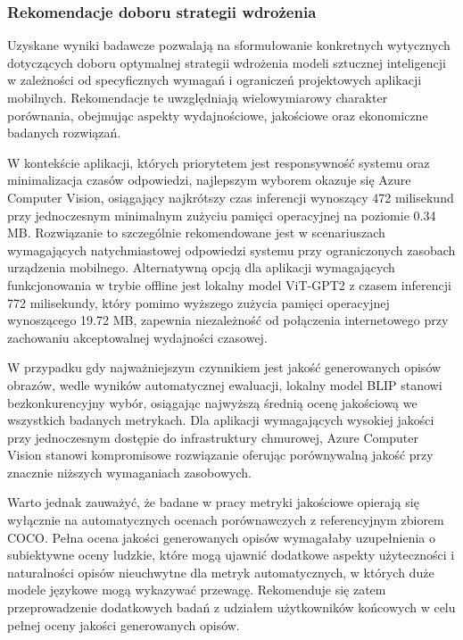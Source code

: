 \subsubsection{Rekomendacje doboru strategii wdrożenia}\label{sss:rekomendacje doboru}
\noindent
Uzyskane wyniki badawcze pozwalają na sformułowanie konkretnych wytycznych dotyczących doboru optymalnej strategii wdrożenia modeli 
sztucznej inteligencji w zależności od specyficznych wymagań i ograniczeń projektowych aplikacji mobilnych. 
Rekomendacje te uwzględniają wielowymiarowy charakter porównania, obejmując aspekty wydajnościowe, jakościowe oraz ekonomiczne badanych rozwiązań.

W kontekście aplikacji, których priorytetem jest responsywność systemu oraz minimalizacja czasów odpowiedzi,
najlepszym wyborem okazuje się Azure Computer Vision, osiągający najkrótszy czas inferencji wynoszący 472 milisekund przy jednoczesnym minimalnym zużyciu 
pamięci operacyjnej na poziomie 0.34 MB. Rozwiązanie to szczególnie rekomendowane jest w scenariuszach wymagających natychmiastowej odpowiedzi systemu 
przy ograniczonych zasobach urządzenia mobilnego. Alternatywną opcją dla aplikacji wymagających funkcjonowania w trybie offline jest lokalny model ViT-GPT2 
z czasem inferencji 772 milisekundy, który pomimo wyższego zużycia pamięci operacyjnej wynoszącego 19.72 MB, zapewnia niezależność od połączenia internetowego 
przy zachowaniu akceptowalnej wydajności czasowej.

W przypadku gdy najważniejszym czynnikiem jest jakość generowanych opisów obrazów, wedle wyników automatycznej ewaluacji, 
lokalny model BLIP stanowi bezkonkurencyjny wybór, osiągając najwyższą średnią ocenę jakościową we wszystkich badanych metrykach. 
Dla aplikacji wymagających wysokiej jakości przy jednoczesnym dostępie do infrastruktury chmurowej, Azure Computer Vision stanowi kompromisowe rozwiązanie
oferując porównywalną jakość przy znacznie niższych wymaganiach zasobowych.

Warto jednak zauważyć, że badane w pracy metryki jakościowe opierają się wyłącznie na automatycznych ocenach porównawczych z referencyjnym zbiorem COCO.
Pełna ocena jakości generowanych opisów wymagałaby uzupełnienia o subiektywne oceny ludzkie, które mogą ujawnić dodatkowe aspekty użyteczności i naturalności opisów
nieuchwytne dla metryk automatycznych, w których duże modele językowe mogą wykazywać przewagę. Rekomenduje się zatem przeprowadzenie dodatkowych badań z udziałem użytkowników końcowych
w celu pełnej oceny jakości generowanych opisów.

